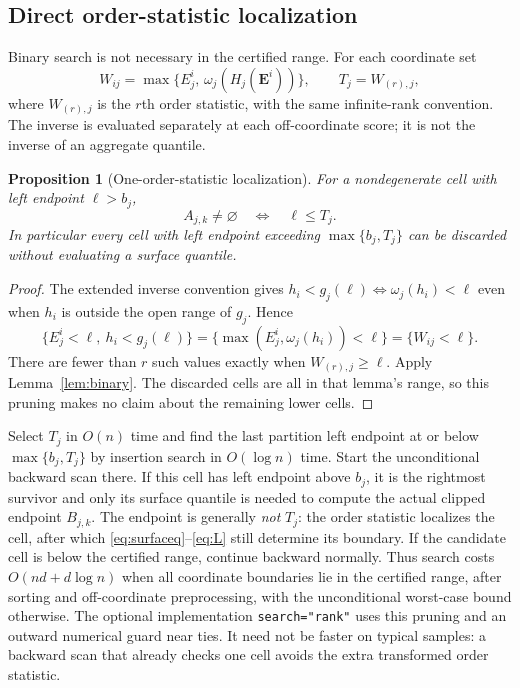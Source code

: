 \documentclass[11pt]{article}
\newtheorem{proposition}[theorem]{Proposition}
\newcommand{\E}{\mathbf E}
\begin{document}
\subsection{Direct order-statistic localization}\label{sec:ranklocal}
Binary search is not necessary in the certified range. For each coordinate set
\[
 W_{ij}=\max\{E^i_j,\,\omega_j(H_j(\E^i))\},\qquad
 T_j=W_{(r),j},
\]
where $W_{(r),j}$ is the $r$th order statistic, with the same infinite-rank
convention. The inverse is evaluated separately at each off-coordinate score;
it is not the inverse of an aggregate quantile.
\begin{proposition}[One-order-statistic localization]\label{prop:ranklocal}
For a nondegenerate cell with left endpoint $\ell>b_j$,
\[
 A_{j,k}\ne\varnothing\quad\Longleftrightarrow\quad \ell\le T_j.
\]
In particular every cell with left endpoint exceeding
$\max\{b_j,T_j\}$ can be discarded without evaluating a surface quantile.
\end{proposition}
\begin{proof}
The extended inverse convention gives
$h_i<g_j(\ell)\Longleftrightarrow\omega_j(h_i)<\ell$ even when
$h_i$ is outside the open range of $g_j$. Hence
\[
 \{E^i_j<\ell,\ h_i<g_j(\ell)\}
 =\{\max(E^i_j,\omega_j(h_i))<\ell\}=\{W_{ij}<\ell\}.
\]
There are fewer than $r$ such values exactly when $W_{(r),j}\ge\ell$.
Apply Lemma~\ref{lem:binary}. The discarded cells are all in that lemma's
range, so this pruning makes no claim about the remaining lower cells.
\end{proof}
Select $T_j$ in $O(n)$ time and find the last partition left endpoint at or
below $\max\{b_j,T_j\}$ by insertion search in $O(\log n)$ time. Start the
unconditional backward scan there. If this cell has left endpoint above $b_j$,
it is the rightmost survivor and only its surface quantile is needed to compute
the actual clipped endpoint $B_{j,k}$. The endpoint is generally \emph{not}
$T_j$: the order statistic localizes the cell, after which
\eqref{eq:surfaceq}--\eqref{eq:L} still determine its boundary.
If the candidate cell is below the certified range, continue backward normally.
Thus search costs $O(nd+d\log n)$ when all coordinate boundaries lie in the
certified range, after sorting and off-coordinate preprocessing, with the
unconditional worst-case bound otherwise. The optional implementation
\texttt{search="rank"} uses this pruning and an outward numerical guard near
ties. It need not be faster on typical samples: a backward scan that already
checks one cell avoids the extra transformed order statistic.
\end{document}
